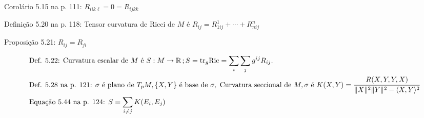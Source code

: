 \documentclass[10pt,a4paper]{article}
\begin{document}
		Corol\'ario 5.15 na p. 111: $R_{iik\ell} = 0 = R_{ijkk}$

		Defini\c{c}\~ao 5.20 na p. 118: Tensor curvatura de Ricci de $M$ \'e $R_{ij} = R_{1ij}^1 + \cdots + R_{nij}^n$

		Proposi\c{c}\~ao 5.21: $R_{ij} = R_{ji}$

		\begin{align*}
		&\text{Def. 5.22: Curvatura escalar de } M \text{ \'e } S : M \rightarrow \mathbb{R}\,; S = \text{tr}_g \text{Ric} = \sum_i \sum_j g^{ij} R_{ij}. \\
		&\text{Def. 5.28 na p. 121: } \sigma \text{ \'e plano de } T_pM, \{X, Y \} \text{ \'e base de } \sigma, \text{ Curvatura seccional de }M, \sigma \text{ \'e } K(X,Y) = \cfrac{R(X,Y,Y,X)}{\Vert X \Vert^2 \Vert Y \Vert^2 - \langle X, Y \rangle^2} \\
		&\text{Equa\c{c}\~ao 5.44 na p. 124: }S = \sum_{i \ne j} K(E_i, E_j)
		\end{align*}
\end{document}
